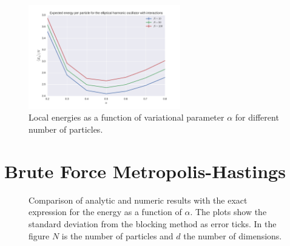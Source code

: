 \documentclass[
    a4paper, aps, twocolumn, floatfix, superscriptaddress, nofootinbib]{revtex4-1}
\newcommand{\1}{\mathds{1}}
\begin{document}
         \begin{figure}
             \includegraphics[width=250px]{../data/figures/problem_e.pdf}
             \caption{Local energies as a function of variational parameter $\alpha$
             				 for different number of particles.}
             \label{fig:interacting}
         \end{figure}

\appendix
\section{Brute Force Metropolis-Hastings}

    \begin{figure}
        \caption{Comparison of analytic and numeric results with the exact
        expression for the energy as a function of $\alpha$. The plots show the
        standard deviation from the blocking method as error ticks. In the
        figure $N$ is the number of particles and $d$ the number of dimensions.}
        \label{fig:initial_problem_b}
    \end{figure}



\end{document}
